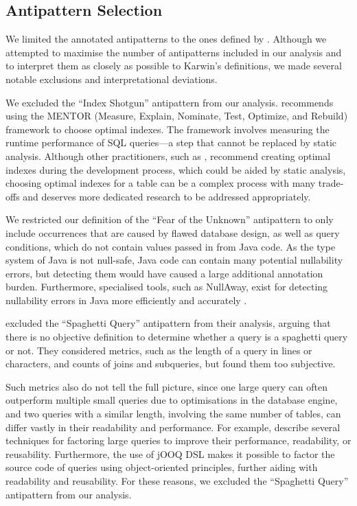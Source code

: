 \subsection{Antipattern Selection}\label{sec:antipatternSelection}

We limited the annotated antipatterns to the ones defined by . Although we attempted to maximise the number of antipatterns included in our analysis and to interpret them as closely as possible to Karwin’s definitions, we made several notable exclusions and interpretational deviations.

We excluded the “Index Shotgun” antipattern from our analysis.  recommends using the MENTOR (Measure, Explain, Nominate, Test, Optimize, and Rebuild) framework to choose optimal indexes. The framework involves measuring the runtime performance of SQL queries—a step that cannot be replaced by static analysis. Although other practitioners, such as , recommend creating optimal indexes during the development process, which could be aided by static analysis, choosing optimal indexes for a table can be a complex process with many trade-offs and deserves more dedicated research to be addressed appropriately.

We restricted our definition of the “Fear of the Unknown” antipattern to only include occurrences that are caused by flawed database design, as well as query conditions, which do not contain values passed in from Java code. As the type system of Java is not null-safe, Java code can contain many potential nullability errors, but detecting them would have caused a large additional annotation burden. Furthermore, specialised tools, such as NullAway, exist for detecting nullability errors in Java more efficiently and accurately .

 excluded the “Spaghetti Query” antipattern from their analysis, arguing that there is no objective definition to determine whether a query is a spaghetti query or not. They considered metrics, such as the length of a query in lines or characters, and counts of joins and subqueries, but found them too subjective.

Such metrics also do not tell the full picture, since one large query can often outperform multiple small queries due to optimisations in the database engine, and two queries with a similar length, involving the same number of tables, can differ vastly in their readability and performance. For example,  describe several techniques for factoring large queries to improve their performance, readability, or reusability. Furthermore, the use of jOOQ DSL makes it possible to factor the source code of queries using object-oriented principles, further aiding with readability and reusability. For these reasons, we excluded the “Spaghetti Query” antipattern from our analysis.

